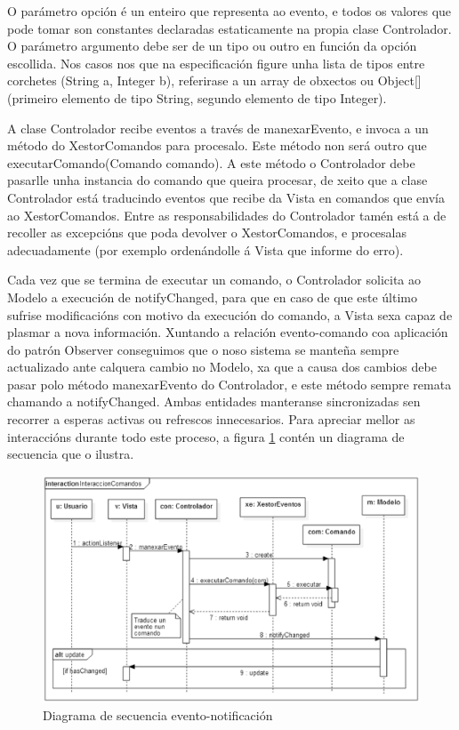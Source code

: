 O parámetro opción é un enteiro que representa ao evento, e todos os valores que pode tomar son constantes declaradas estaticamente na propia clase Controlador. O parámetro argumento debe ser de un tipo ou outro en función da opción escollida. Nos casos nos que na especificación figure unha lista de tipos entre corchetes ({String a, Integer b}), referirase a un array de obxectos ou Object[] (primeiro elemento de tipo String, segundo elemento de tipo Integer).

A clase Controlador recibe eventos a través de manexarEvento, e invoca a un método do XestorComandos para procesalo. Este método non será outro que executarComando(Comando comando). A este método o Controlador debe pasarlle unha instancia do comando que queira procesar, de xeito que a clase Controlador está traducindo eventos que recibe da Vista en comandos que envía ao XestorComandos. Entre as responsabilidades do Controlador tamén está a de recoller as excepcións que poda devolver o XestorComandos, e procesalas adecuadamente (por exemplo ordenándolle á Vista que informe do erro).

Cada vez que se termina de executar un comando, o Controlador solicita ao Modelo a execución de notifyChanged, para que en caso de que este último sufrise modificacións con motivo da execución do comando, a Vista sexa capaz de plasmar a nova información. Xuntando a relación evento-comando coa aplicación do patrón Observer conseguimos que o noso sistema se manteña sempre actualizado ante calquera cambio no Modelo, xa que a causa dos cambios debe pasar polo método manexarEvento do Controlador, e este método sempre remata chamando a notifyChanged. Ambas entidades manteranse sincronizadas sen recorrer a esperas activas ou refrescos innecesarios. Para apreciar mellor as interaccións durante todo este proceso, a figura \ref{DScomandos} contén un diagrama de secuencia que o ilustra.

\begin{figure}
\centering
\includegraphics[width=\textwidth,height=\textheight,keepaspectratio]{figuras/DScomandos}
\caption{Diagrama de secuencia evento-notificación}
\label{DScomandos}
\end{figure}

